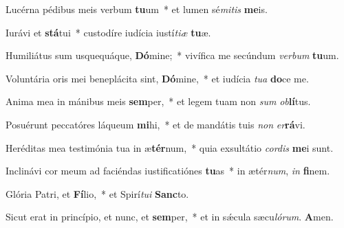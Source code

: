\item Lucérna pédibus meis verbum \textbf{tu}um~* et lumen sé\textit{mitis} \textbf{me}is.

\item Iurávi et \textbf{stá}tui~* custodíre iudícia iustí\textit{tiæ} \textbf{tu}æ.

\item Humiliátus sum usquequáque, \textbf{Dó}mine;~* vivífica me secúndum \textit{verbum} \textbf{tu}um.

\item Voluntária oris mei beneplácita sint, \textbf{Dó}mine,~* et iudícia \textit{tua} \textbf{do}ce me.

\item Anima mea in mánibus meis \textbf{sem}per,~* et legem tuam non \textit{sum} \textit{ob}\textbf{lí}tus.

\item Posuérunt peccatóres láqueum \textbf{mi}hi,~* et de mandátis tuis \textit{non} \textit{er}\textbf{rá}vi.

\item Heréditas mea testimónia tua in æ\textbf{tér}num,~* quia exsultátio \textit{cordis} \textbf{me}i sunt.

\item Inclinávi cor meum ad faciéndas iustificatiónes \textbf{tu}as~* in ætér\textit{num}, \textit{in} \textbf{fi}nem.

\item Glória Patri, et \textbf{Fí}lio,~* et Spirí\textit{tui} \textbf{Sanc}to.

\item Sicut erat in princípio, et nunc, et \textbf{sem}per,~* et in sǽcula sæcu\textit{lórum}. \textbf{A}men.
